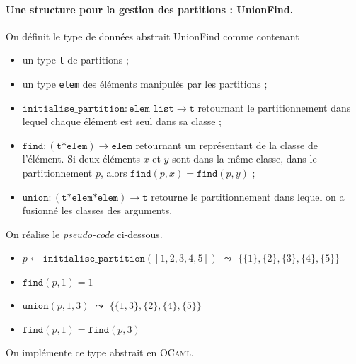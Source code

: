 \paragraph{Une structure pour la gestion des partitions : \textsf{UnionFind}.}

\begin{defn}
	On définit le type de données abstrait \textsf{UnionFind} comme contenant
	\begin{itemize}
		\item un type \texttt{t} de partitions ;
		\item un type \texttt{elem} des éléments manipulés par les partitions ;
		\item $\texttt{initialise\_partition} : \texttt{elem list} \to \texttt{t}$\/ retournant le partitionnement dans lequel chaque élément est seul dans sa classe ;
		\item $\texttt{find} : (\texttt{t} \mathbin{\texttt{*}} \texttt{elem}) \to \texttt{elem}$\/ retournant un représentant de la classe de l'élément. Si deux éléments $x$\/ et $y$\/ sont dans la même classe, dans le partitionnement $p$, alors $\texttt{find}(p,x) = \texttt{find}(p,y)$ ;
		\item $\texttt{union} : (\texttt{t} \mathbin{\texttt{*}} \texttt{elem} \mathbin{\texttt{*}} \texttt{elem}) \to \texttt{t}$\/ retourne le partitionnement dans lequel on a fusionné les classes des arguments.
	\end{itemize}
\end{defn}

\begin{exm}
	On réalise le \textit{pseudo-code} ci-dessous.
	\begin{itemize}
		\item $p \gets \texttt{initialise\_partition}([1, 2, 3, 4, 5])$\/ $\leadsto$ $\{\{1\}, \{2\}, \{3\}, \{4\}, \{5\}\}$
		\item $\texttt{find}(p, 1) = 1$\/ 
		\item $\texttt{union}(p, 1, 3)$\/ $\leadsto$ $\{\{1,3\}, \{2\}, \{4\}, \{5\}\}$
		\item $\texttt{find}(p, 1) = \texttt{find}(p, 3)$
	\end{itemize}
\end{exm}

On implémente ce type abstrait en \textsc{OCaml}.

